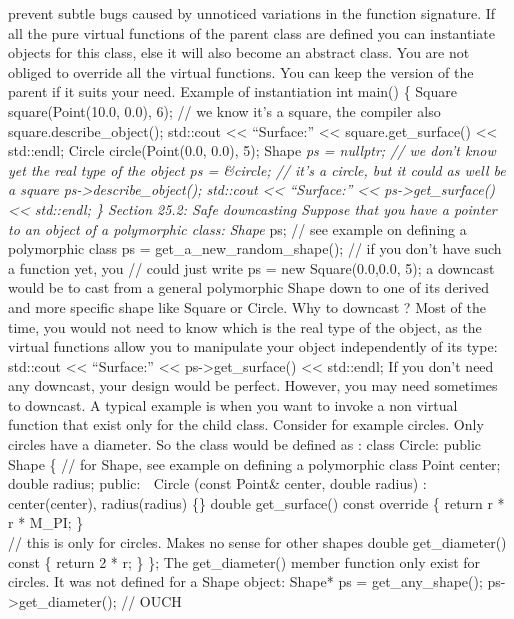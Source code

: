 prevent subtle bugs caused by unnoticed variations in the function
signature. If all the pure virtual functions of the parent class are
deﬁned you can instantiate objects for this class, else it will also
become an abstract class. You are not obliged to override all the
virtual functions. You can keep the version of the parent if it suits
your need. Example of instantiation int main() \{ Square
square(Point(10.0, 0.0), 6); // we know it's a square, the compiler also
square.describe\_object(); std::cout \textless\textless{} ``Surface:''
\textless\textless{} square.get\_surface() \textless\textless{}
std::endl; Circle circle(Point(0.0, 0.0), 5); Shape \emph{ps = nullptr;
// we don't know yet the real type of the object ps = \&circle; // it's
a circle, but it could as well be a square
ps-\textgreater describe\_object(); std::cout \textless\textless{}
``Surface:'' \textless\textless{} ps-\textgreater get\_surface()
\textless\textless{} std::endl; \} Section 25.2: Safe downcasting
Suppose that you have a pointer to an object of a polymorphic class:
Shape }ps; // see example on defining a polymorphic class ps =
get\_a\_new\_random\_shape(); // if you don't have such a function yet,
you // could just write ps = new Square(0.0,0.0, 5); a downcast would be
to cast from a general polymorphic Shape down to one of its derived and
more speciﬁc shape like Square or Circle. Why to downcast ? Most of the
time, you would not need to know which is the real type of the object,
as the virtual functions allow you to manipulate your object
independently of its type: std::cout \textless\textless{} ``Surface:''
\textless\textless{} ps-\textgreater get\_surface() \textless\textless{}
std::endl; If you don't need any downcast, your design would be perfect.
However, you may need sometimes to downcast. A typical example is when
you want to invoke a non virtual function that exist only for the child
class. Consider for example circles. Only circles have a diameter. So
the class would be deﬁned as : class Circle: public Shape \{ // for
Shape, see example on defining a polymorphic class Point center; double
radius; public:  Circle (const Point\& center, double radius) :
center(center), radius(radius) \{\} double get\_surface() const override
\{ return r * r * M\_PI; \}\\
// this is only for circles. Makes no sense for other shapes double
get\_diameter() const \{ return 2 * r; \} \}; The get\_diameter() member
function only exist for circles. It was not deﬁned for a Shape object:
Shape* ps = get\_any\_shape(); ps-\textgreater get\_diameter(); // OUCH
